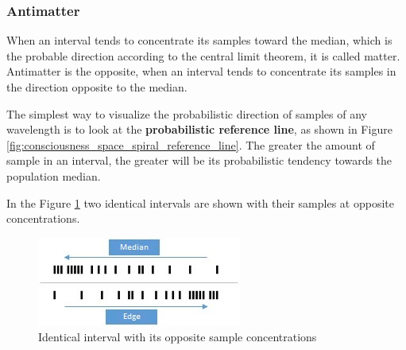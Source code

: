 \subsubsection{Antimatter}
When an interval tends to concentrate its samples toward the median, which is the probable direction according to the central limit theorem, it is called matter. Antimatter is the opposite, when an interval tends to concentrate its samples in the direction opposite to the median. 

The simplest way to visualize the probabilistic direction of samples of any wavelength is to look at the \textbf{probabilistic reference line}, as shown in Figure \ref{fig:consciousness_space_spiral_reference_line}. The greater the amount of sample in an interval, the greater will be its probabilistic tendency towards the population median.

In the Figure \ref{fig:consciousness_concentration_of_opposite_samples} two identical intervals are shown with their samples at opposite concentrations.
	\begin{figure}[H]
	\caption{Identical interval with its opposite sample concentrations}
	\label{fig:consciousness_concentration_of_opposite_samples}
	\centering
	\includegraphics[scale=1.2]{sections/images/consciousness_concentration_of_opposite_samples.jpg}
	\end{figure}

